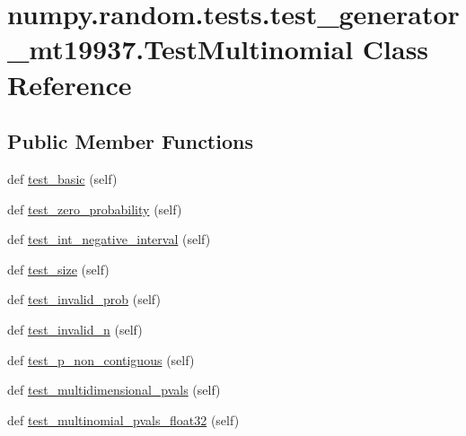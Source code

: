 \hypertarget{classnumpy_1_1random_1_1tests_1_1test__generator__mt19937_1_1TestMultinomial}{}\section{numpy.\+random.\+tests.\+test\+\_\+generator\+\_\+mt19937.\+Test\+Multinomial Class Reference}
\label{classnumpy_1_1random_1_1tests_1_1test__generator__mt19937_1_1TestMultinomial}
\subsection*{Public Member Functions}
\begin{DoxyCompactItemize}
\item 
def \hyperlink{classnumpy_1_1random_1_1tests_1_1test__generator__mt19937_1_1TestMultinomial_aa5e9a4ea7c9b06906801a7f5118cdaca}{test\+\_\+basic} (self)
\item 
def \hyperlink{classnumpy_1_1random_1_1tests_1_1test__generator__mt19937_1_1TestMultinomial_a357f565ed895eef3c3b95f74a39a8cb4}{test\+\_\+zero\+\_\+probability} (self)
\item 
def \hyperlink{classnumpy_1_1random_1_1tests_1_1test__generator__mt19937_1_1TestMultinomial_a9b963f0c351768c87e3a9c9f11626ea5}{test\+\_\+int\+\_\+negative\+\_\+interval} (self)
\item 
def \hyperlink{classnumpy_1_1random_1_1tests_1_1test__generator__mt19937_1_1TestMultinomial_a2bd203b4cba9f060f173cb38fe80b6d7}{test\+\_\+size} (self)
\item 
def \hyperlink{classnumpy_1_1random_1_1tests_1_1test__generator__mt19937_1_1TestMultinomial_a7529226eb84793211f032d2320ad1555}{test\+\_\+invalid\+\_\+prob} (self)
\item 
def \hyperlink{classnumpy_1_1random_1_1tests_1_1test__generator__mt19937_1_1TestMultinomial_aaf56118510cddb043c588b72ea8745cf}{test\+\_\+invalid\+\_\+n} (self)
\item 
def \hyperlink{classnumpy_1_1random_1_1tests_1_1test__generator__mt19937_1_1TestMultinomial_ab764a22e5bf74c2f58b32181d016d511}{test\+\_\+p\+\_\+non\+\_\+contiguous} (self)
\item 
def \hyperlink{classnumpy_1_1random_1_1tests_1_1test__generator__mt19937_1_1TestMultinomial_ac57fa0be266a6870fefa3ca0edf02493}{test\+\_\+multidimensional\+\_\+pvals} (self)
\item 
def \hyperlink{classnumpy_1_1random_1_1tests_1_1test__generator__mt19937_1_1TestMultinomial_a239bf3f9b18887a94feff8ae127d7dd9}{test\+\_\+multinomial\+\_\+pvals\+\_\+float32} (self)
\end{DoxyCompactItemize}


